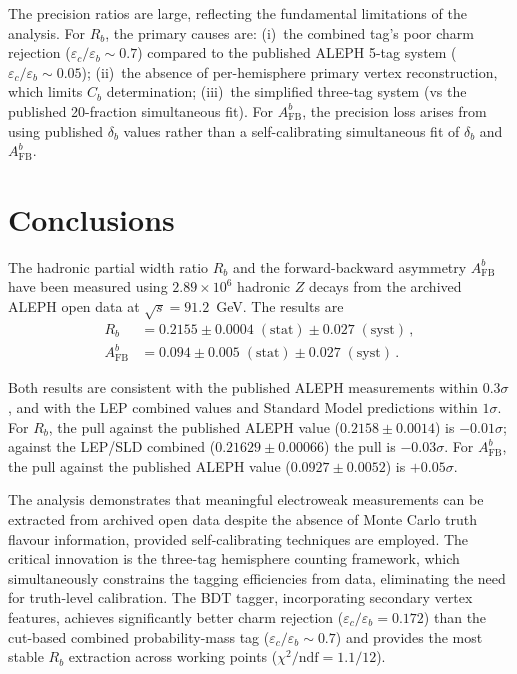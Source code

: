 \documentclass[11pt,a4paper]{article}
\begin{document}
The precision ratios are large, reflecting the fundamental limitations of
the analysis.  For $R_b$, the primary causes are:
(i)~the combined tag's poor charm rejection ($\varepsilon_c/\varepsilon_b
\sim 0.7$) compared to the published ALEPH 5-tag system
($\varepsilon_c/\varepsilon_b \sim 0.05$);
(ii)~the absence of per-hemisphere primary vertex reconstruction, which
limits $C_b$ determination;
(iii)~the simplified three-tag system (vs the published 20-fraction
simultaneous fit).  For $A_\mathrm{FB}^b$, the precision loss arises from
using published $\delta_b$ values rather than a self-calibrating
simultaneous fit of $\delta_b$ and $A_\mathrm{FB}^b$.

\section{Conclusions}
\label{sec:conclusions}

The hadronic partial width ratio $R_b$ and the forward-backward
asymmetry $A_\mathrm{FB}^b$ have been measured using $2.89 \times 10^6$
hadronic $Z$ decays from the archived ALEPH open data at
$\sqrt{s} = 91.2$~GeV.  The results are
\begin{align*}
  R_b &= 0.2155 \pm 0.0004\;\mathrm{(stat)} \pm 0.027\;\mathrm{(syst)}\,,\\
  A_\mathrm{FB}^b &= 0.094 \pm 0.005\;\mathrm{(stat)} \pm 0.027\;\mathrm{(syst)}\,.
\end{align*}

Both results are consistent with the published ALEPH measurements within
$0.3\sigma$, and with the LEP combined values and Standard Model predictions
within $1\sigma$.  For $R_b$, the pull against the published ALEPH value
($0.2158 \pm 0.0014$) is $-0.01\sigma$; against the LEP/SLD combined
($0.21629 \pm 0.00066$) the pull is $-0.03\sigma$.  For $A_\mathrm{FB}^b$,
the pull against the published ALEPH value ($0.0927 \pm 0.0052$) is
$+0.05\sigma$.

The analysis demonstrates that meaningful electroweak measurements can be
extracted from archived open data despite the absence of Monte Carlo truth
flavour information, provided self-calibrating techniques are employed.
The critical innovation is the three-tag hemisphere counting framework,
which simultaneously constrains the tagging efficiencies from data,
eliminating the need for truth-level calibration.  The BDT tagger,
incorporating secondary vertex features, achieves significantly better
charm rejection ($\varepsilon_c/\varepsilon_b = 0.172$) than the
cut-based combined probability-mass tag ($\varepsilon_c/\varepsilon_b
\sim 0.7$) and provides the most stable $R_b$ extraction across
working points ($\chi^2/\mathrm{ndf} = 1.1/12$).
\end{document}
